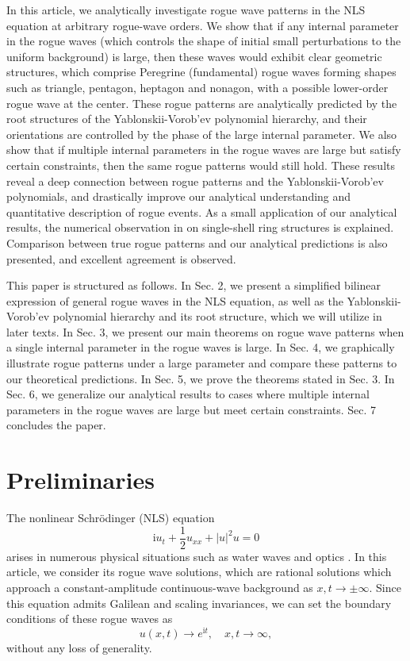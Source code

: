 \documentclass[amsmath,amssymb]{revtex4}
\def\[{\begin{equation}}
\def\]{\end{equation}}
\begin{document}
In this article, we analytically investigate rogue wave patterns in the NLS equation at arbitrary rogue-wave orders. We show that if any internal parameter in the rogue waves (which controls the shape of initial small perturbations to the uniform background) is large, then these waves would exhibit clear geometric structures, which comprise Peregrine (fundamental) rogue waves forming shapes such as triangle, pentagon, heptagon and nonagon, with a possible lower-order rogue wave at the center. These rogue patterns are analytically predicted by the root structures of the Yablonskii-Vorob'ev polynomial hierarchy, and their orientations are controlled by the phase of the large internal parameter. We also show that if multiple internal parameters in the rogue waves are large but satisfy certain constraints, then the same rogue patterns would still hold. These results reveal a deep connection between rogue patterns and the Yablonskii-Vorob'ev polynomials, and drastically improve our analytical understanding and quantitative description of rogue events. As a small application of our analytical results, the numerical observation in \cite{KAAN2011} on single-shell ring structures is explained. Comparison between true rogue patterns and our analytical predictions is also presented, and excellent agreement is observed.

This paper is structured as follows. In Sec. 2, we present a simplified bilinear expression of general rogue waves in the NLS equation, as well as the Yablonskii-Vorob'ev polynomial hierarchy and its root structure, which we will utilize in later texts. In Sec. 3, we present our main theorems on rogue wave patterns when a single internal parameter in the rogue waves is large. In Sec. 4, we graphically illustrate rogue patterns under a large parameter and compare these patterns to our theoretical predictions. In Sec. 5, we prove the theorems stated in Sec. 3. In Sec. 6, we generalize our analytical results to cases where multiple internal parameters in the rogue waves are large but meet certain constraints. Sec. 7 concludes the paper.

\section{Preliminaries} \label{sec:pre}
The nonlinear Schr\"{o}dinger (NLS) equation
\[ \label{NLS-2020}
\textrm{i} u_{t} +  \frac{1}{2}u_{xx}+ |u|^2 u=0
\]
arises in numerous physical situations such as water waves and optics \cite{Benney,Ablowitzbook,Kivsharbook}. In this article, we consider its rogue wave solutions, which are rational solutions which approach a constant-amplitude continuous-wave background as $x, t\to \pm \infty$. Since this equation admits Galilean and scaling invariances, we can set the boundary conditions of these rogue waves as
\[ \label{bc}
u(x, t) \to e^{\textrm{i} t}, \quad x, t \to \infty,
\]
without any loss of generality.
\end{document}
